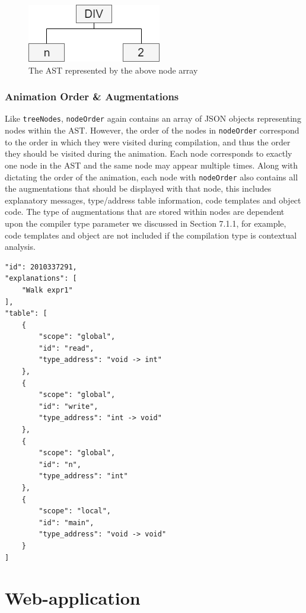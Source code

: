 \documentclass{l4proj}
\begin{document}
 \begin{figure}[h]
\centering
\includegraphics[scale=0.6]{images/treeNodes.png}
\caption{The AST represented by the above node array}
\label{fig:treeNodes}	
\end{figure}

\subsubsection{Animation Order \& Augmentations}
Like \texttt{treeNodes}, \texttt{nodeOrder} again contains an array of JSON objects representing nodes within the AST. However, the order of the nodes in \texttt{nodeOrder} correspond to the order in which they were visited during compilation, and thus the order they should be visited during the animation. Each node corresponds to exactly one node in the AST and the same node may appear multiple times. Along with dictating the order of the animation, each node with \texttt{nodeOrder} also contains all the augmentations that should be displayed with that node, this includes explanatory messages, type/address table information, code templates and object code. The type of augmentations that are stored within nodes are dependent upon the compiler type parameter we discussed in Section 7.1.1, for example, code templates and object are not included if the compilation type is contextual analysis. 

\begin{lstlisting}
"id": 2010337291,
"explanations": [
	"Walk expr1"
],
"table": [
	{
		"scope": "global",
		"id": "read",
		"type_address": "void -> int"
	},
	{
		"scope": "global",
		"id": "write",
		"type_address": "int -> void"
	},
	{
		"scope": "global",
		"id": "n",
		"type_address": "int"
	},
	{
		"scope": "local",
		"id": "main",
		"type_address": "void -> void"
	}
]
 \end{lstlisting}

\section{Web-application}
\end{document}
